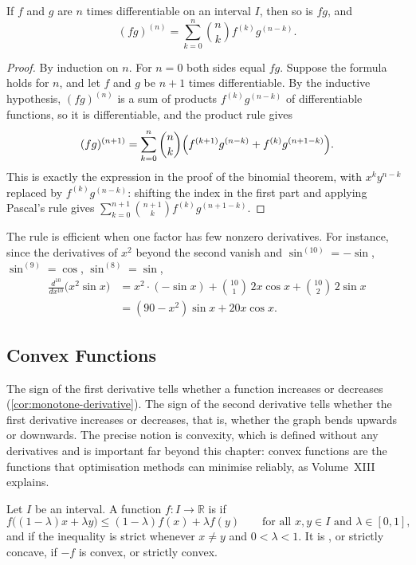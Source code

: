 \begin{theorem}
\label{thm:leibniz-rule}
If $f$ and $g$ are $n$ times differentiable on an interval $I$, then so is $fg$, and
\[
(fg)^{(n)}=\sum_{k=0}^n\binom nk f^{(k)}g^{(n-k)} .
\]
\end{theorem}

\begin{proof}
By induction on $n$. For $n=0$ both sides equal $fg$. Suppose the formula holds for $n$, and let $f$ and $g$ be $n+1$ times differentiable. By the inductive hypothesis, $(fg)^{(n)}$ is a sum of products $f^{(k)}g^{(n-k)}$ of differentiable functions, so it is differentiable, and the product rule gives
\[
(fg)^{(n+1)}=\sum_{k=0}^n\binom nk\Bigl(f^{(k+1)}g^{(n-k)}+f^{(k)}g^{(n+1-k)}\Bigr).
\]
This is exactly the expression in the proof of the binomial theorem, with $x^ky^{n-k}$ replaced by $f^{(k)}g^{(n-k)}$: shifting the index in the first part and applying Pascal's rule gives $\sum_{k=0}^{n+1}\binom{n+1}kf^{(k)}g^{(n+1-k)}$.
\end{proof}

The rule is efficient when one factor has few nonzero derivatives. For instance, since the derivatives of $x^2$ beyond the second vanish and $\sin^{(10)}=-\sin$, $\sin^{(9)}=\cos$, $\sin^{(8)}=\sin$,
\begin{align*}
\frac{d^{10}}{dx^{10}}\bigl(x^2\sin x\bigr)&=x^2\cdot(-\sin x)+\binom{10}1\,2x\cos x+\binom{10}2\,2\sin x\\
&=(90-x^2)\sin x+20x\cos x .
\end{align*}

\subsection{Convex Functions}

The sign of the first derivative tells whether a function increases or decreases (\cref{cor:monotone-derivative}). The sign of the second derivative tells whether the first derivative increases or decreases, that is, whether the graph bends upwards or downwards. The precise notion is convexity, which is defined without any derivatives and is important far beyond this chapter: convex functions are the functions that optimisation methods can minimise reliably, as Volume~XIII explains.

\begin{definition}
\label{def:convex}
Let $I$ be an interval. A function $f\colon I\to\mathbb R$ is  if
\[
f\bigl((1-\lambda)x+\lambda y\bigr)\le(1-\lambda)f(x)+\lambda f(y)\qquad\text{for all }x,y\in I\text{ and }\lambda\in[0,1],
\]
and  if the inequality is strict whenever $x\ne y$ and $0<\lambda<1$. It is , or strictly concave, if $-f$ is convex, or strictly convex.
\end{definition}

